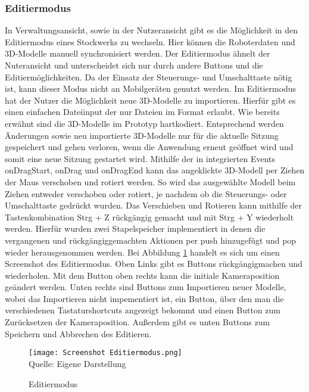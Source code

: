 \subsubsection{Editiermodus}
In Verwaltungsansicht, sowie in der Nutzeransicht gibt es die Möglichkeit in den Editiermodus eines Stockwerks zu wechseln. Hier können die Roboterdaten und 3D-Modelle manuell synchronisiert werden. Der Editiermodus ähnelt der Nuteransicht und unterscheidet sich nur durch andere Buttons und die Editiermöglichkeiten. Da der Einsatz der Steuerungs- und Umschalttaste nötig ist, kann dieser Modus nicht an Mobilgeräten genutzt werden. Im Editiermodus hat der Nutzer die Möglichkeit neue 3D-Modelle zu importieren. Hierfür gibt es einen einfachen Dateiinput der nur Dateien im \glb{} Format erlaubt. Wie bereits erwähnt sind die 3D-Modelle im Prototyp hartkodiert. Entsprechend werden Änderungen sowie neu importierte 3D-Modelle nur für die aktuelle Sitzung gespeichert und gehen verloren, wenn die Anwendung erneut geöffnet wird und somit eine neue Sitzung gestartet wird. Mithilfe der in \deckgl{} integrierten Events onDragStart, onDrag und onDragEnd \cite{DeckglInteractivity} kann das angeklickte 3D-Modell per Ziehen der Maus verschoben und rotiert werden. So wird das ausgewählte Modell beim Ziehen entweder verschoben oder rotiert, je nachdem ob die Steuerungs- oder Umschalttaste gedrückt wurden. Das Verschieben und Rotieren kann mithilfe der Tastenkombination Strg + Z rückgängig gemacht und mit Strg + Y wiederholt werden. Hierfür wurden zwei Stapelspeicher implementiert in denen die vergangenen und rückgängiggemachten Aktionen per push hinzugefügt und pop wieder herausgenommen werden. Bei Abbildung \ref{fig:EditmodeScreenshot} handelt es sich um einen Screenshot des Editiermodus. Oben Links gibt es Buttons rückgängigmachen und wiederholen. Mit dem Button oben rechts kann die initiale Kameraposition geändert werden. Unten rechts sind Buttons zum Importieren neuer Modelle, wobei das Importieren nicht impementiert ist, ein Button, über den man die verschiedenen Tastaturshortcuts angezeigt bekommt und einen Button zum Zurücksetzen der Kameraposition. Außerdem gibt es unten Buttons zum Speichern und Abbrechen des Editieren.

\begin{figure}[H]
    \caption{Editiermodus}\label{fig:EditmodeScreenshot}
    \texttt{[image: Screenshot Editiermodus.png]}
    \\
    Quelle: Eigene Darstellung
\end{figure}

